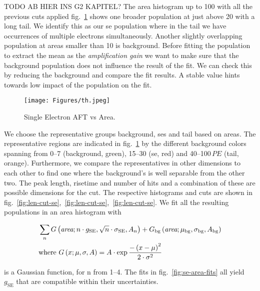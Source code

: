 TODO AB HIER INS G2 KAPITEL?
The area histogram up to \SI{100}{} with all the previous cuts applied fig.~\ref{fig:se-area-hist} shows one broader population at just above \SI{20}{} with a long tail.
We identify this as our \gls{se} population where in the tail we have occurrences of multiple electrons simultaneously.
Another slightly overlapping population at areas smaller than \SI{10}{} is background.
Before fitting the population to extract the mean as the \emph{amplification gain} we want to make sure that the background population does not influence the result of the fit.
We can check this by reducing the background and compare the fit results.
A stable value hints towards low impact of the population on the fit.

\begin{figure}
    \centering
    \texttt{[image: Figures/th.jpeg]}  %
    \caption[Histogram Area Single Electrons and Background]{
        Single Electron AFT vs Area.
    }
    \label{fig:se-area-hist}
\end{figure}


We choose the representative groups background, \gls{se}s and tail based on areas.
The representative regions are indicated in fig.~\ref{fig:se-area-hist} by the different background colors spanning from \numrange{0}{7} (background, green), \numrange{15}{30} (\gls{se}, red) and \numrange{40}{100}$ \,\mathit{PE} $ (tail, orange).
Furthermore, we compare the representatives in other dimensions to each other to find one where the background's is well separable from the other two.
The peak length, risetime and number of hits and a combination of these are possible dimensions for the cut.
The respective histograms and cuts are shown in fig.~\ref{fig:len-cut-se},~\ref{fig:len-cut-se},~\ref{fig:len-cut-se}.
We fit all the resulting populations in an area histogram with %


\begin{align}
    &\sum_{n} G \left(  \textit{area}; n \cdot g_\mathrm{SE}, \sqrt{n} \cdot \sigma_\mathrm{SE}, A_n \right) +
    G_\mathrm{bg} \left( \textit{area};  \mu_\mathrm{bg}, \sigma_\mathrm{bg}, A_\mathrm{bg} \right) \\
    &\mathrm{where~} G \left( x;  \mu, \sigma, A \right) = A \cdot \exp{ \frac{-\left( x - \mu \right)^2}{2\cdot\sigma^2}}
    \label{eq:se-fit-model}
\end{align}


is a Gaussian function, for n from \numrange{1}{4}.
The fits in fig.~\ref{fig:se-area-fits} all yield $ g_\mathrm{SE} $ that are compatible within their uncertainties.




